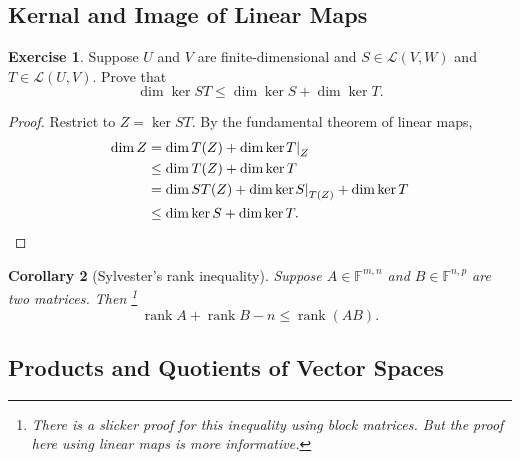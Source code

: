 \documentclass{tufte-handout}
\theoremstyle{plain} %
\newtheorem{thm}{Theorem}
\newtheorem{cor}[thm]{Corollary}
\newtheorem{lem}[thm]{Lemma}
\theoremstyle{definition}
\newtheorem{exer}[thm]{Exercise}
\theoremstyle{remark}
\newcommand{\bra}[1]{\mathopen{}\left(#1\right)}
\newcommand{\rest}[2]{\mathopen{}\left.#1\right|_{#2}}
\newcommand{\F}{\mathbb{F}}
\renewcommand{\L}{\mathcal{L}}
\DeclareMathOperator{\rank}{rank}
\begin{document}
\subsection{Kernal and Image of Linear Maps}
\begin{exer}
	Suppose $U$ and $V$ are finite-dimensional and $S\in\L\bra{V,W}$ and $T\in\L\bra{U,V}$. Prove that
	\[\dim\ker ST \leq \dim\ker S + \dim\ker T.\]
\end{exer}
\begin{proof}
	Restrict to $Z=\ker ST$. By the fundamental theorem of linear maps,
	\begin{align*}
		\dim Z & = \dim T(Z) + \dim\ker \rest{T}{Z} \\
		& \leq \dim T(Z) + \dim\ker T \\
		& = \dim ST(Z) + \dim\ker \rest{S}{T(Z)} + \dim\ker T \\
		& \leq \dim\ker S + \dim\ker T.\qedhere
	\end{align*}
\end{proof}

\begin{cor}[Sylvester's rank inequality]
	Suppose $A\in\F^{m,n}$ and $B\in\F^{n,p}$ are two matrices. Then%
	\footnote{There is a slicker proof for this inequality using block matrices. But the proof here using linear maps is more informative.}
	\[\rank A+\rank B-n\leq\rank\bra{AB}.\]
\end{cor}


\subsection{Products and Quotients of Vector Spaces}

\end{document}
